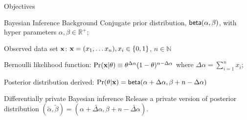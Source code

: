 \documentclass[final,hyperref={pdfpagelabels=false}]{beamer}
\begin{document}
\begin{frame}[t]
\begin{columns}[t]
\begin{column}{.485\textwidth}
\begin{block}{Objectives}

\end{block}

            
\begin{block}{Bayesian Inference Background}
Conjugate prior distribution, $\mathsf{beta}(\alpha, \beta)$, with hyper parameters $\alpha,\beta\in\mathbb{R}^{+}$;

Observed data set $\textbf{x}$: $\textbf{x}= (x_1,\dots x_n), x_i\in\{0,1\}$, $n\in\mathbb{N}$

Bernoulli likelihood function:
  $\Pr(\textbf{x} | \theta)\equiv \theta^{\Delta \alpha}(1-\theta)^{n - \Delta \alpha}$
where $\Delta \alpha = \displaystyle\sum_{i=1}^{n}x_i$;

Posterior distribution derived: 
$\Pr(\theta|\textbf{x})=\mathsf{beta}(\alpha + \Delta \alpha,\beta + n - \Delta \alpha)$

\end{block}


\begin{block}{Differentially private Bayesian inference}
Release a private version of posterior distribution $(\tilde\alpha,\tilde\beta)=(\alpha +  \widetilde{\Delta \alpha},\beta + n - \widetilde{\Delta \alpha})$.


\end{block}
\end{column}
\end{columns}
\end{frame}
\end{document}

